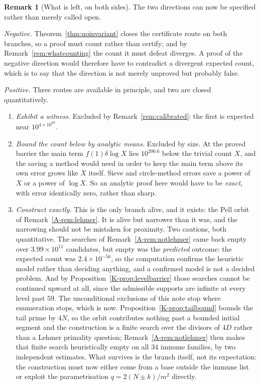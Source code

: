 \documentclass[11pt]{article}
\theoremstyle{definition}
\newtheorem{remark}[theorem]{Remark}
\begin{document}
\begin{remark}[What is left, on both sides]\label{rem:whatisleft}
The two directions can now be specified rather than merely called open.

\emph{Negative.} Theorem~\ref{thm:noinvariant} closes the certificate route on both branches, so a
proof must count rather than certify; and by Remark~\ref{rem:whatcounting} the count it must defeat
diverges. A proof of the negative direction would therefore have to contradict a divergent expected
count, which is to say that the direction is not merely unproved but probably false.

\emph{Positive.} Three routes are available in principle, and two are closed quantitatively.
\begin{enumerate}[label=\textup{(\alph*)},leftmargin=2.2em]
\item \emph{Exhibit a witness.} Excluded by Remark~\ref{rem:calibrated}: the first is expected near
$10^{4\times10^{89}}$.
\item \emph{Bound the count below by analytic means.} Excluded by size. At the proved barrier the
main term $f(1)\delta\log X$ lies $10^{200.6}$ below the trivial count $X$, and the saving a method
would need in order to keep the main term above its own error grows like $X$ itself. Sieve and
circle-method errors save a power of $X$ or a power of $\log X$. So an analytic proof here would
have to be \emph{exact}, with error identically zero, rather than sharp.
\item \emph{Construct exactly.} This is the only branch alive, and it exists: the Pell orbit of
Remark~\ref{A-rem:lehmer}. It is alive but narrower than it was, and the narrowing should not be
mistaken for proximity. Two cautions, both quantitative. The searches of
Remark~\ref{A-rem:notlehmer} came back empty over $3.99\times10^{11}$ candidates, but empty was the
\emph{predicted} outcome: the expected count was $2.4\times10^{-56}$, so the computation confirms the
heuristic model rather than deciding anything, and a confirmed model is not a decided problem. And by
Proposition~\ref{K-prop:levelbarrier} those searches cannot be continued upward at all, since the
admissible supports are infinite at every level past $59$. The unconditional exclusions of this note
stop where enumeration stops, which is now.
Proposition~\ref{K-prop:tailbound} bounds the tail prime by $4N$, so the orbit contributes nothing past
a bounded initial segment and the construction is a finite search over the divisors of $4D$ rather
than a Lehmer primality question; Remark~\ref{A-rem:notlehmer} then makes that finite search
heuristically empty on all $34$ immune families, by two independent estimates. What survives is the
branch itself, not its expectation: the construction must now either come from a base outside the
immune list or exploit the parametrisation $q=2(N\pm k)/m^2$ directly.
\end{enumerate}


\end{remark}
\end{document}
